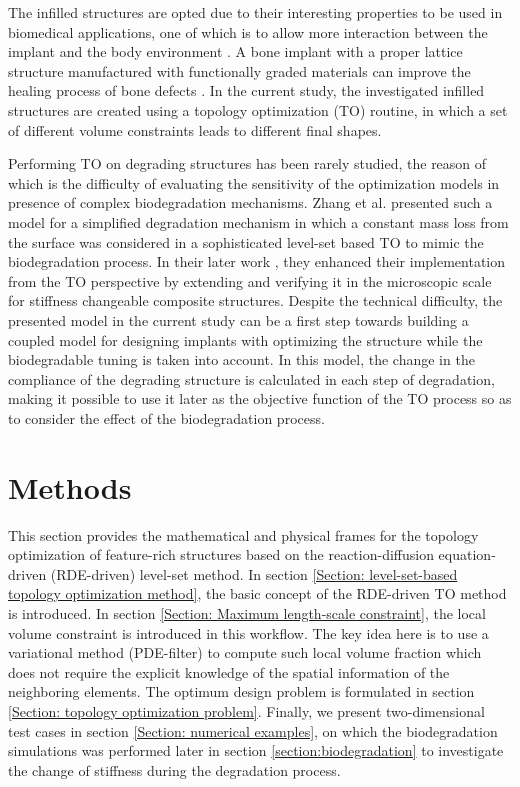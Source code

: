 The infilled structures are opted due to their interesting properties to be used in biomedical applications, one of which is to allow more interaction between the implant and the body environment \cite{Birmingham2012}. A bone implant with a proper lattice structure manufactured with functionally graded materials can improve the healing process of bone defects \cite{Mahmoud2017}. In the current study, the investigated infilled structures are created using a topology optimization (TO) routine, in which a set of different volume constraints leads to different final shapes. 

Performing TO on degrading structures has been rarely studied, the reason of which is the difficulty of evaluating the sensitivity of the optimization models in presence of complex biodegradation mechanisms. Zhang et al. \cite{Zhang2021} presented such a model for a simplified degradation mechanism in which a constant mass loss from the surface was considered in a sophisticated level-set based TO to mimic the biodegradation process. In their later work \cite{Zhang2021a}, they enhanced their implementation from the TO perspective by extending and verifying it in the microscopic scale for stiffness changeable composite structures. Despite the technical difficulty, the presented model in the current study can be a first step towards building a coupled model for designing implants with optimizing the structure while the biodegradable tuning is taken into account. In this model, the change in the compliance of the degrading structure is calculated in each step of degradation, making it possible to use it later as the objective function of the TO process so as to consider the effect of the biodegradation process.


\section{Methods}

This section provides the mathematical and physical frames for the topology optimization of feature-rich structures based on the reaction-diffusion equation-driven (RDE-driven) level-set method. In section \ref{Section: level-set-based topology optimization method}, the basic concept of the RDE-driven TO method is introduced. In section \ref{Section: Maximum length-scale constraint}, the local volume constraint is introduced in this workflow. The key idea here is to use a variational method (PDE-filter) to compute such local volume fraction which does not require the explicit knowledge of the spatial information of the neighboring elements. The optimum design problem is formulated in section \ref{Section: topology optimization problem}. Finally, we present two-dimensional test cases in section \ref{Section: numerical examples}, on which the biodegradation simulations was performed later in section \ref{section:biodegradation} to investigate the change of stiffness during the degradation process.


